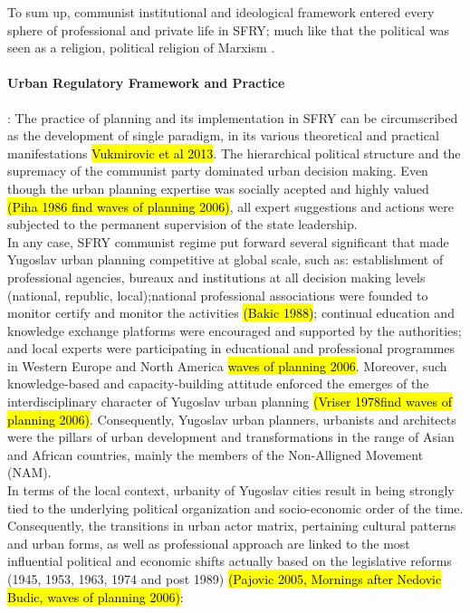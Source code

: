 \documentclass[11pt]{report}
\begin{document}
To sum up, communist institutional and ideological framework entered every sphere of professional and private life in SFRY; much like that the political was seen as a religion, political religion of Marxism \cite{Samardzic in Doytchinov 2015}. 

\paragraph{Urban Regulatory Framework and Practice}:
The practice of planning and its implementation in SFRY can be circumscribed as the development of single paradigm, in its various theoretical and practical manifestations \hl{Vukmirovic et al 2013}. The hierarchical political structure and the supremacy of the communist party dominated urban decision making. Even though the urban planning expertise was socially acepted and highly valued \hl{(Piha 1986 find waves of planning 2006)}, all expert suggestions and actions were subjected to the permanent supervision of the state leadership.
\\
In any case, SFRY communist regime put forward several significant that made Yugoslav urban planning competitive at global scale, such as: 
establishment of professional agencies, bureaux and institutions at all decision making levels (national, republic, local);\footnotemark national professional associations were founded to monitor certify and monitor the activities \hl{(Bakic 1988)}; continual education and knowledge exchange platforms were encouraged and supported by the authorities; and local experts were participating in educational and professional programmes in Western Europe and North America \hl{waves of planning 2006}.
Moreover, such knowledge-based and capacity-building attitude enforced the emerges of the interdisciplinary character of Yugoslav urban planning \hl{(Vriser 1978find waves of planning 2006)}.
Consequently, Yugoslav urban planners, urbanists and architects were the pillars of urban development and transformations in the range of Asian and African countries, mainly the members of the Non-Alligned Movement (NAM).
\\
In terms of the local context, urbanity of Yugoslav cities result in being strongly tied to the underlying political organization and socio-economic order of the time.
Consequently, the transitions in urban actor matrix, pertaining cultural patterns and urban forms, as well as professional approach are linked to the most influential political and economic shifts actually based on the legislative reforms (1945, 1953, 1963, 1974 and post 1989) \hl{(Pajovic 2005, Mornings after Nedovic Budic, waves of planning 2006)}:
\end{document}

